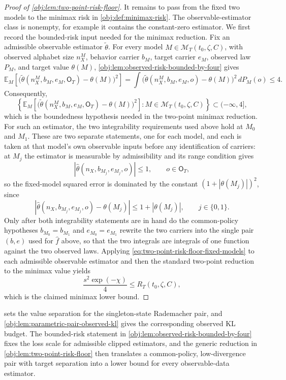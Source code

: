 \documentclass[11pt]{article}
\begin{document}
\begin{proof}[Proof of \cref{obj:lem:two-point-risk-floor}]
It remains to pass from the fixed two models to the minimax risk in
\cref{obj:def:minimax-risk}.  The observable-estimator class is nonempty, for
example it contains the constant-zero estimator.  We first record the bounded-risk input needed for the minimax reduction.  Fix an admissible observable estimator \(\widetilde\theta\).  For every model
\(M\in\mathcal M_T(t_0,\zeta,C)\), with observed alphabet size \(n_X^M\), behavior carrier \(b_M\), target carrier \(e_M\), observed law \(P_M\), and target value \(\theta(M)\), \cref{obj:lem:observed-risk-bounded-by-four} gives
\[
\mathbb E_M\!\left[
\bigl(\widetilde\theta(n_X^M,b_M,e_M,\mathsf O_T)-\theta(M)\bigr)^2
\right]
=
\int\bigl(\widetilde\theta(n_X^M,b_M,e_M,o)-\theta(M)\bigr)^2\,dP_M(o)
\le 4.
\]
Consequently,
\[
\left\{
\mathbb E_M\!\left[
\bigl(\widetilde\theta(n_X^M,b_M,e_M,\mathsf O_T)-\theta(M)\bigr)^2
\right]:
M\in\mathcal M_T(t_0,\zeta,C)
\right\}
\subset (-\infty,4],
\]
which is the boundedness hypothesis needed in the two-point minimax reduction. %
For such an estimator, the two integrability requirements used above hold at
\(M_0\) and \(M_1\).  These are two separate statements, one for each model, and
each is taken at that model's own observable inputs before any identification of
carriers: at \(M_j\) the estimator is measurable by admissibility and its range
condition gives
\[
|\widehat\theta(n_X,b_{M_j},e_{M_j},o)|\le 1,
\qquad o\in\mathsf O_T,
\]
so the fixed-model squared error is dominated by the constant
\((1+|\theta(M_j)|)^2\), since
\[
|\widehat\theta(n_X,b_{M_j},e_{M_j},o)-\theta(M_j)|
\le
1+|\theta(M_j)|,
\qquad j\in\{0,1\}.
\]
Only after both integrability statements are in hand do the common-policy
hypotheses \(b_{M_0}=b_{M_1}\) and \(e_{M_0}=e_{M_1}\) rewrite the two carriers
into the single pair \((b,e)\) used for \(\widehat f\) above, so that the two
integrals are integrals of one function against the two observed laws.
Applying \cref{eq:two-point-risk-floor-fixed-models} to each admissible observable estimator and then the standard
two-point reduction to the minimax value yields
\[
\frac{s^2\exp(-\chi)}{4}
\le
R_T(t_0,\zeta,C),
\]
which is the claimed minimax lower bound. %
\end{proof}

 sets the value separation for the singleton-state Rademacher pair, and \cref{obj:lem:parametric-pair-observed-kl} gives the corresponding observed KL budget. The bounded-risk statement in \cref{obj:lem:observed-risk-bounded-by-four} fixes the loss scale for admissible clipped estimators, and the generic reduction in \cref{obj:lem:two-point-risk-floor} then translates a common-policy, low-divergence pair with target separation into a lower bound for every observable-data estimator.
\end{document}
